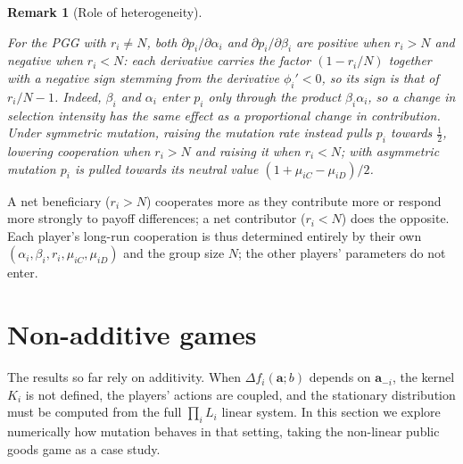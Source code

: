 \documentclass[11pt]{article}
\newtheorem{remark}{Remark}
\newcommand{\bfa}{\mathbf{a}}
\begin{document}
\begin{remark}[Role of heterogeneity]\label{rem:heterogeneity}

For the PGG with \(r_i\neq N\), both \(\partial p_i/\partial\alpha_i\) and
\(\partial p_i/\partial\beta_i\) are positive when \(r_i>N\) and negative when
\(r_i<N\):
each derivative carries the factor \((1-r_i/N)\) together with a negative sign
stemming from the derivative \(\phi_i'<0\), so its sign is that of \(r_i/N-1\).
Indeed, \(\beta_i\) and \(\alpha_i\) enter
\(p_i\) only through the product \(\beta_i\alpha_i\), so a change in selection intensity
has
the same effect as a proportional change in contribution. Under symmetric mutation,
raising
the mutation rate instead pulls \(p_i\) towards \(\tfrac{1}{2}\), lowering cooperation
when
\(r_i>N\) and raising it when \(r_i<N\); with asymmetric mutation \(p_i\) is pulled
towards
its neutral value \((1+\mu_{iC}-\mu_{iD})/2\).

\end{remark}

A net beneficiary (\(r_i>N\)) cooperates more as they contribute more or
respond more strongly to payoff differences; a net contributor (\(r_i<N\))
does the opposite. Each player's long-run cooperation is thus determined entirely by
their own
\((\alpha_i,\beta_i,r_i,\mu_{iC},\mu_{iD})\) and the group size \(N\); the other
players'
parameters do not enter.

\section{Non-additive games}\label{sec:non-additive}

The results so far rely on additivity. When \(\Delta f_i(\bfa;b)\) depends on
\(\bfa_{-i}\), the kernel \(K_i\) is not defined, the players' actions are
coupled, and the stationary distribution must be computed from the full
\(\prod_i L_i\) linear system. In this section we explore numerically how
mutation behaves in that setting, taking the non-linear public goods game as
a case study.
\end{document}
